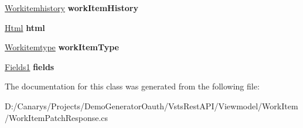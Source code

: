 \begin{DoxyCompactItemize}
\item 
\mbox{\label{class_vsts_rest_a_p_i_1_1_viewmodel_1_1_work_item_1_1_work_item_patch_response_1_1___links_a628707bdbf8a4b3d5d5adc8da4107b4e}} 
\mbox{\hyperlink{class_vsts_rest_a_p_i_1_1_viewmodel_1_1_work_item_1_1_work_item_patch_response_1_1_workitemhistory}{Workitemhistory}} {\bfseries work\+Item\+History}
\item 
\mbox{\label{class_vsts_rest_a_p_i_1_1_viewmodel_1_1_work_item_1_1_work_item_patch_response_1_1___links_a611f044cd7c00afb7e93f8bba29d3c07}} 
\mbox{\hyperlink{class_vsts_rest_a_p_i_1_1_viewmodel_1_1_work_item_1_1_work_item_patch_response_1_1_html}{Html}} {\bfseries html}
\item 
\mbox{\label{class_vsts_rest_a_p_i_1_1_viewmodel_1_1_work_item_1_1_work_item_patch_response_1_1___links_a6d538d613eb43f7b992a63da1ecc3207}} 
\mbox{\hyperlink{class_vsts_rest_a_p_i_1_1_viewmodel_1_1_work_item_1_1_work_item_patch_response_1_1_workitemtype}{Workitemtype}} {\bfseries work\+Item\+Type}
\item 
\mbox{\label{class_vsts_rest_a_p_i_1_1_viewmodel_1_1_work_item_1_1_work_item_patch_response_1_1___links_a2a683bdbb46271ecb2a653e5cd0d804d}} 
\mbox{\hyperlink{class_vsts_rest_a_p_i_1_1_viewmodel_1_1_work_item_1_1_work_item_patch_response_1_1_fields1}{Fields1}} {\bfseries fields}
\end{DoxyCompactItemize}


The documentation for this class was generated from the following file\+:\begin{DoxyCompactItemize}
\item 
D\+:/\+Canarys/\+Projects/\+Demo\+Generator\+Oauth/\+Vsts\+Rest\+A\+P\+I/\+Viewmodel/\+Work\+Item/Work\+Item\+Patch\+Response.\+cs\end{DoxyCompactItemize}
